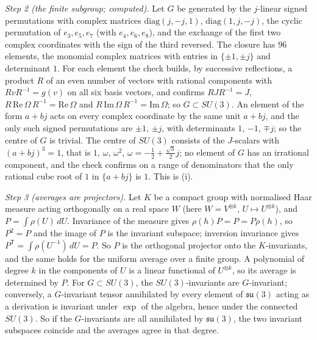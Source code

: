 \emph{Step 2 (the finite subgroup; computed).} Let $G$ be generated by the $j$-linear signed permutations with complex matrices $\mathrm{diag}(j, -j, 1)$, $\mathrm{diag}(1, j, -j)$, the cyclic permutation of $e_{3}, e_{5}, e_{7}$ (with $e_{4}, e_{6}, e_{8}$), and the exchange of the first two complex coordinates with the sign of the third reversed. The closure has $96$ elements, the monomial complex matrices with entries in $\{\pm1, \pm j\}$ and determinant $1$. For each element the check builds, by successive reflections, a product $R$ of an even number of vectors with rational components with $RvR^{-1} = g(v)$ on all six basis vectors, and confirms $RJR^{-1} = J$, $R\,\mathrm{Re}\,\Omega\,R^{-1} = \mathrm{Re}\,\Omega$ and $R\,\mathrm{Im}\,\Omega\,R^{-1} = \mathrm{Im}\,\Omega$; so $G \subset SU(3)$. An element of the form $a + bj$ acts on every complex coordinate by the same unit $a + bj$, and the only such signed permutations are $\pm1$, $\pm j$, with determinants $1$, $-1$, $\mp j$; so the centre of $G$ is trivial. The centre of $SU(3)$ consists of the $J$-scalars with $(a + bj)^{3} = 1$, that is $1$, $\omega$, $\omega^{2}$, $\omega = -\tfrac12 + \tfrac{\sqrt3}{2}j$; no element of $G$ has an irrational component, and the check confirms on a range of denominators that the only rational cube root of $1$ in $\{a + bj\}$ is $1$. This is (i).

\emph{Step 3 (averages are projectors).} Let $K$ be a compact group with normalised Haar measure acting orthogonally on a real space $W$ (here $W = V^{\otimes k}$, $U \mapsto U^{\otimes k}$), and $P = \int\rho(U)\,dU$. Invariance of the measure gives $\rho(h)P = P = P\rho(h)$, so $P^{2} = P$ and the image of $P$ is the invariant subspace; inversion invariance gives $P^{\mathsf T} = \int\rho(U^{-1})\,dU = P$. So $P$ is the orthogonal projector onto the $K$-invariants, and the same holds for the uniform average over a finite group. A polynomial of degree $k$ in the components of $U$ is a linear functional of $U^{\otimes k}$, so its average is determined by $P$. For $G \subset SU(3)$, the $SU(3)$-invariants are $G$-invariant; conversely, a $G$-invariant tensor annihilated by every element of $\mathfrak{su}(3)$ acting as a derivation is invariant under $\exp$ of the algebra, hence under the connected $SU(3)$. So if the $G$-invariants are all annihilated by $\mathfrak{su}(3)$, the two invariant subspaces coincide and the averages agree in that degree.


